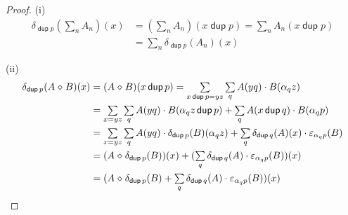 \documentclass{article}
\renewcommand\smash{\mathrel{\diamond}}
\newcommand\ssum{\mathop{\textstyle\sum}}
\newcommand\sbigcup{\mathop{\textstyle\bigcup}}
\newcommand\pdup{\mathop{\mathsf{dup}}}
\begin{document}
\begin{proof}
(i)
%
\begin{align*}
\delta_{\pdup p}(\ssum_n A_n)(x)
&= (\ssum_n A_n)(x\pdup p)
= \ssum_n A_n(x\pdup p)\\
&= \ssum_n \delta_{\pdup p}(A_n)(x)
\end{align*}

(ii)
%
\begin{align*}
\delta_{\pdup p}(A\smash B)(x)
&= (A\smash B)(x\pdup p)
= \ssum_{x\pdup p=yz}\ssum_q A(yq)\cdot B(\alpha_qz)\\
&= \ssum_{x=yz}\ssum_q A(yq)\cdot B(\alpha_qz\pdup p) + \ssum_q A(x\pdup q)\cdot B(\alpha_qp)\\
&= \ssum_{x=yz}\ssum_q A(yq)\cdot\delta_{\pdup p}(B)(\alpha_qz) + \ssum_q \delta_{\pdup q}(A)(x)\cdot\eps_{\alpha_qp}(B)\\
&= (A\smash\delta_{\pdup p}(B))(x) + (\ssum_q \delta_{\pdup q}(A)\cdot\eps_{\alpha_qp}(B))(x)\\
&= (A\smash\delta_{\pdup p}(B) + \ssum_q \delta_{\pdup q}(A)\cdot\eps_{\alpha_qp}(B))(x)\\
\end{align*}
%
%

\end{proof}
\end{document}
